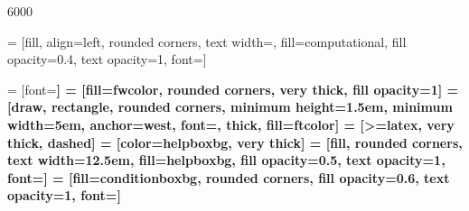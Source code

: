 \setlength{\intextsep}{25pt}

 6000
\raggedbottom

\usepackage{tikz}
\usetikzlibrary{arrows, positioning, fit, backgrounds, calc}

\usepackage{pgfplots}
\pgfplotsset{compat=newest}


 = [fill, align=left, rounded corners, text width=\textwidth, fill=computational, fill opacity=0.4, text opacity=1, font=\small]




 = [font=\bf\ttfamily]
 = [fill=fwcolor, rounded corners, very thick, fill opacity=1]
 = [draw, rectangle, rounded corners, minimum height=1.5em, minimum width=5em, anchor=west, font=\footnotesize\ttfamily, thick, fill=ftcolor]
 = [>=latex, very thick, dashed]
 = [color=helpboxbg, very thick]
 = [fill, rounded corners, text width=12.5em, fill=helpboxbg, fill opacity=0.5, text opacity=1, font=\small]
 = [fill=conditionboxbg, rounded corners, fill opacity=0.6, text opacity=1, font=\footnotesize]



\usepackage{hyperref}
\hypersetup{
    colorlinks=true,
    linkcolor=black,
    filecolor=magenta,      
    urlcolor=blue,
}


\usepackage{ifthen}

\newcommand{\tocite}{\todo[inline]{CITE}}


\newcommand{\code}[1]{\texttt{\hl{#1}}}
\newcommand{\link}[2] {\hyperref[#1]{\textcolor{link}{#2}}}
\newcommand{\firetask}[1] {\hyperref[automation:sec-#1]{\textcolor{black}{\texttt{#1}}}}
\newcommand{\vasp}[1] {\hyperref[appendix:sec-#1]{\textcolor{link}{\texttt{#1}}}}
 
